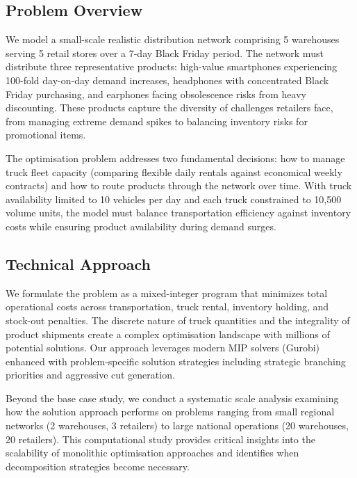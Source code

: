 \documentclass[a4paper,12pt]{article}
\begin{document}
\subsection{Problem Overview}\label{subsec:problem-overview}

We model a small-scale realistic distribution network comprising 5 warehouses serving 5 retail stores over a 7-day Black Friday period.
The network must distribute three representative products: high-value smartphones experiencing 100-fold day-on-day demand increases, headphones with concentrated Black Friday purchasing, and earphones facing obsolescence risks from heavy discounting.
These products capture the diversity of challenges retailers face, from managing extreme demand spikes to balancing inventory risks for promotional items.

The optimisation problem addresses two fundamental decisions: how to manage truck fleet capacity (comparing flexible daily rentals against economical weekly contracts) and how to route products through the network over time.
With truck availability limited to 10 vehicles per day and each truck constrained to 10,500 volume units, the model must balance transportation efficiency against inventory costs while ensuring product availability during demand surges.

\subsection{Technical Approach}\label{subsec:technical-approach}

We formulate the problem as a mixed-integer program that minimizes total operational costs across transportation, truck rental, inventory holding, and stock-out penalties.
The discrete nature of truck quantities and the integrality of product shipments create a complex optimisation landscape with millions of potential solutions.
Our approach leverages modern MIP solvers (Gurobi) enhanced with problem-specific solution strategies including strategic branching priorities and aggressive cut generation.

Beyond the base case study, we conduct a systematic scale analysis examining how the solution approach performs on problems ranging from small regional networks (2 warehouses, 3 retailers) to large national operations (20 warehouses, 20 retailers).
This computational study provides critical insights into the scalability of monolithic optimisation approaches and identifies when decomposition strategies become necessary.
\end{document}

